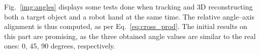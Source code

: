 Fig.~\ref{img:angles} displays some tests done when tracking and 3D reconstructing both a target object and a robot hand at the same time. The relative angle--axis alignment is thus computed, as per Eq.~\ref{eq:cross_prod}. The initial results on this part are promising, as the three obtained angle values are similar to the real ones: 0, 45, 90 degrees, respectively.